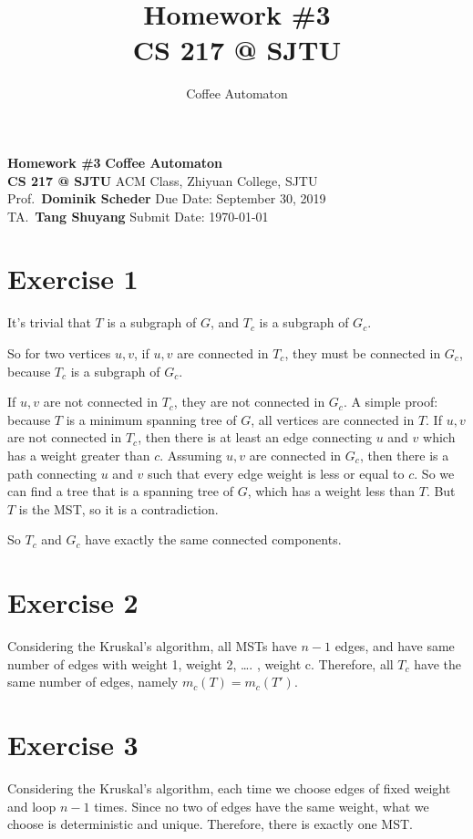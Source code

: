\documentclass[
]{article}
\title{
  \vspace{2in}
  \textmd{\textbf{Homework \#3}}
  \normalsize\vspace{0.1in}\\
  \textmd{\textbf{CS 217 @ SJTU}}
  \normalsize\vspace{0.1in}\\
}
\author{Coffee Automaton}
\date{}
\begin{document}
\noindent
\large\textbf{Homework \#3}
\hfill
\textbf{Coffee Automaton} \\
\normalsize {\bf CS 217 @ SJTU} \hfill ACM Class, Zhiyuan College, SJTU\\
Prof.~{\bf Dominik Scheder} \hfill Due Date: September 30, 2019\\
  TA.~{\bf Tang Shuyang}
\hfill Submit Date: \today


\hypertarget{exercise-1}{%
\section{Exercise 1}\label{exercise-1}}

It's trivial that \(T\) is a subgraph of \(G\), and \(T_{c}\) is a
subgraph of \(G_{c}\).

So for two vertices \(u,v\), if \(u,v\) are connected in \(T_{c}\), they
must be connected in \(G_{c}\), because \(T_{c}\) is a subgraph of
\(G_{c}\).

If \(u,v\) are not connected in \(T_{c}\), they are not connected in
\(G_{c}\). A simple proof: because \(T\) is a minimum spanning tree of
\(G\), all vertices are connected in \(T\). If \(u,v\) are not connected
in \(T_{c}\), then there is at least an edge connecting \(u\) and \(v\)
which has a weight greater than \(c\). Assuming \(u,v\) are connected in
\(G_{c}\), then there is a path connecting \(u\) and \(v\) such that
every edge weight is less or equal to \(c\). So we can find a tree that
is a spanning tree of \(G\), which has a weight less than \(T\). But
\(T\) is the MST, so it is a contradiction.

So \(T_c\) and \(G_c\) have exactly the same connected components.

\hypertarget{exercise-2}{%
\section{Exercise 2}\label{exercise-2}}

Considering the Kruskal's algorithm, all MSTs have \(n-1\) edges, and
have same number of edges with weight 1, weight 2, \ldots{}. , weight c.
Therefore, all \(T_c\) have the same number of edges, namely
\(m_{c}(T) = m_{c}(T')\).

\hypertarget{exercise-3}{%
\section{Exercise 3}\label{exercise-3}}

Considering the Kruskal's algorithm, each time we choose edges of fixed
weight and loop \(n-1\) times. Since no two of edges have the same
weight, what we choose is deterministic and unique. Therefore, there is
exactly one MST.
\end{document}
